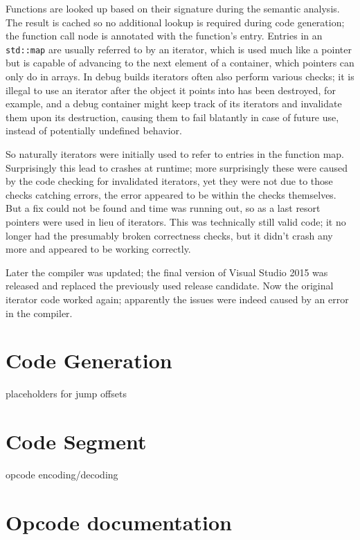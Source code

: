 			Functions are looked up based on their signature during the semantic analysis. The result is cached so no additional lookup is required during code generation; the function call node is annotated with the function's entry. Entries in an \lstinline$std::map$ are usually referred to by an iterator, which is used much like a pointer but is capable of advancing to the next element of a container, which pointers can only do in arrays. In debug builds iterators often also perform various checks; it is illegal to use an iterator after the object it points into has been destroyed, for example, and a debug container might keep track of its iterators and invalidate them upon its destruction, causing them to fail blatantly in case of future use, instead of potentially undefined behavior.
			
			So naturally iterators were initially used to refer to entries in the function map. Surprisingly this lead to crashes at runtime; more surprisingly these were caused by the code checking for invalidated iterators, yet they were not due to those checks catching errors, the error appeared to be within the checks themselves. But a fix could not be found and time was running out, so as a last resort pointers were used in lieu of iterators. This was technically still valid code; it no longer had the presumably broken correctness checks, but it didn't crash any more and appeared to be working correctly.
			
			Later the compiler was updated; the final version of Visual Studio 2015 was released and replaced the previously used release candidate. Now the original iterator code worked again; apparently the issues were indeed caused by an error in the compiler.
		
	\section{Code Generation}
		
		placeholders for jump offsets
	
	\section{Code Segment}
		
		opcode encoding/decoding
	
	\section{Opcode documentation}
	
